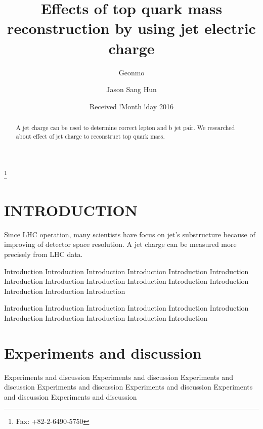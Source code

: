 \documentclass[jkps,fleqn,showpacs,showkeys]{revtex4}
\begin{document}
\setcounter{page}{1}
\title[]{Effects of top quark mass reconstruction by using jet electric charge}
\author{Geonmo }
\thanks{Fax: +82-2-6490-5750}
\author{Jason Sang Hun }
\date[]{Received !Month !day 2016}

\begin{abstract}
A jet charge can be used to determine correct lepton and b jet pair. We researched about effect of jet charge to reconstruct top quark mass. 
\end{abstract}



\maketitle


\section{INTRODUCTION}


Since LHC operation, many scientists have focus on jet's substructure because of improving of detector space resolution. 
A jet charge can be measured more precisely from LHC data.
\cite{R1}


Introduction Introduction Introduction Introduction Introduction
Introduction Introduction Introduction Introduction Introduction
Introduction Introduction Introduction Introduction
Introduction\cite{R2}

Introduction Introduction Introduction Introduction Introduction
Introduction Introduction Introduction Introduction Introduction
Introduction\\






\section{Experiments and discussion}



Experiments and discussion Experiments and discussion Experiments
and discussion Experiments and discussion Experiments and
discussion Experiments and discussion Experiments and discussion
\end{document}
